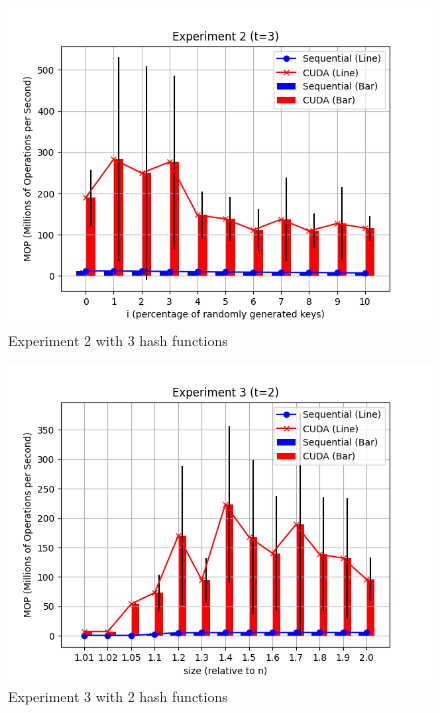 \documentclass{article}
\begin{document}
\begin{figure}[h!]
    \centering
    \includegraphics[width=\textwidth]{../figs/experiment2_t3.png}
    \caption{Experiment 2 with 3 hash functions}
\end{figure}

\begin{figure}[h!]
    \centering
    \includegraphics[width=\textwidth]{../figs/experiment3_t2.png}
    \caption{Experiment 3 with 2 hash functions}
\end{figure}
\end{document}
